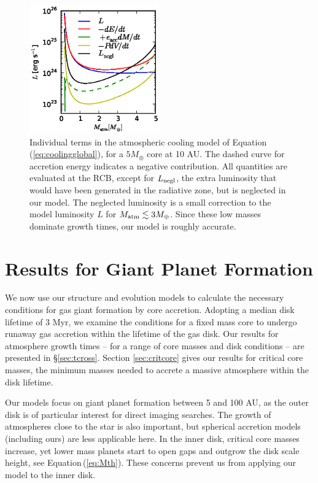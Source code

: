 \documentclass[apj, numberedappendix]{emulateapj}
\newcommand{\Eq}[1]{Equation\,(\ref{#1})}
\begin{document}
 
\begin{figure}[tb]
\centering
\includegraphics[width=0.5\textwidth]{../../figs/ModelAtmospheres/RadSelfGravPoly/PaperFigs/cooling_a10_Mc5_rcb.eps}
\caption{Individual terms in the atmospheric cooling model of \Eq{eq:coolingglobal}, for a $5 M_\oplus$ core at 10 AU.  The dashed curve for accretion energy indicates a negative contribution.  All quantities are evaluated at the RCB, except for $L_{\rm negl}$, the extra luminosity that would have been generated in the radiative zone, but is neglected in our model. The neglected luminosity is a small correction to the model luminosity $L$ for $M_{\rm atm} \lesssim 3 M_{\oplus}$.   Since these low masses dominate growth times, our model is roughly accurate.}
\label{fig:coolingterms}
\end{figure}



\section{Results for Giant Planet Formation}
\label{sec:critical}

We now use our structure and evolution models to calculate the necessary conditions for gas giant formation by core accretion.   Adopting a median disk lifetime of 3 Myr, we examine the conditions for a fixed mass core to undergo runaway gas accretion within the lifetime of the gas disk.  Our results for atmosphere growth times -- for a range of core masses and disk conditions -- are presented in \S\ref{sec:tcross}.  Section \ref{sec:critcore} gives our results for critical core masses, the minimum masses needed to accrete a massive atmosphere within the disk lifetime.

Our models focus on giant planet formation between 5 and 100 AU, as the outer disk is of particular interest for direct imaging searches.   The growth of atmospheres close to the star is also important, but spherical accretion models (including ours) are less applicable here.  In the inner disk, critical core masses increase, yet lower mass planets start to open gaps and outgrow the disk scale height, see \Eq{eq:Mth}.  These concerns prevent us from applying our model to the inner disk. 
\end{document}
